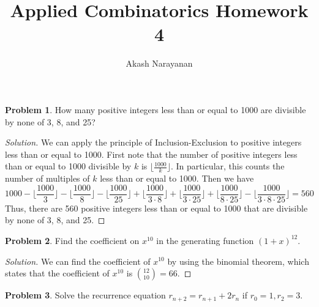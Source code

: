 \documentclass[12pt]{article}
\title{Applied Combinatorics Homework 4}
\author{Akash Narayanan}
\theoremstyle{definition}
\newtheorem{problem-internal}{Problem}[]
\newenvironment{problem}{
  \medskip
  \begin{problem-internal}
}{
\end{problem-internal}
}
\newenvironment{solution}{
  \begin{proof}[Solution]
    \vspace{-8px}
    \setlength{\parskip}{4px}
    \setlength{\parindent}{0px}
}{
\end{proof}
}
\begin{document}
  \maketitle

  \begin{problem}
    How many positive integers less than or equal to 1000 are divisible by none of 3, 8, and 25?
  \end{problem}

  \begin{solution}
    We can apply the principle of Inclusion-Exclusion to positive integers less than or equal to 1000.
    First note that the number of positive integers less than or equal to 1000 divisible by \(k\) is \(\lfloor{\frac{1000}{k}}\rfloor\). In particular, this counts the number of multiples of \(k\) less than or equal to 1000.
    Then we have
    \begin{displaymath}
      1000 - \lfloor{\frac{1000}{3}}\rfloor - \lfloor{\frac{1000}{8}}\rfloor - \lfloor{\frac{1000}{25}}\rfloor + \lfloor{\frac{1000}{3 \cdot 8}}\rfloor + \lfloor{\frac{1000}{3 \cdot 25}}\rfloor + \lfloor{\frac{1000}{8 \cdot 25}}\rfloor - \lfloor{\frac{1000}{3 \cdot 8 \cdot 25}}\rfloor = 560
    \end{displaymath}
    Thus, there are 560 positive integers less than or equal to 1000 that are divisible by none of 3, 8, and 25.
  \end{solution}

  \begin{problem}
    Find the coefficient on \(x^{10}\) in the generating function \(\left(1 + x\right)^{12}\).
  \end{problem}

  \begin{solution}
    We can find the coefficient of \(x^{10}\) by using the binomial theorem, which states that the coefficient of \(x^{10}\) is \({12 \choose 10} = 66\).
  \end{solution}

  \begin{problem}
    Solve the recurrence equation \(r_{n+2} = r_{n+1} + 2r_{n}\) if \(r_{0} = 1, r_{2} = 3\).
  \end{problem}
\end{document}
